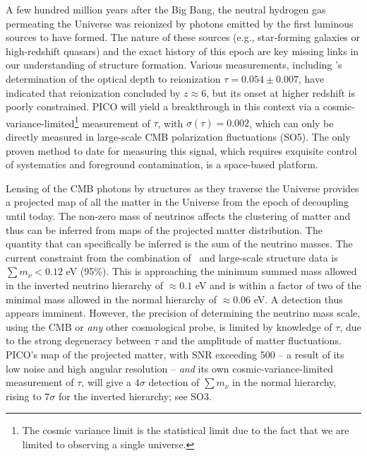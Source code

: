 \documentclass[PICOReport.tex]{subfiles}
\begin{document}
A few hundred million years after the Big Bang, the neutral hydrogen gas permeating the Universe was reionized by photons emitted by the first luminous sources to have formed.  The nature of these sources (e.g., star-forming galaxies or high-redshift quasars) and the exact history of this epoch are key missing links in our understanding of structure formation.  Various measurements, including \planck 's determination of the optical depth to reionization $\tau = 0.054 \pm 0.007$, have indicated that reionization concluded by $z \approx 6$, but its onset at higher redshift is poorly constrained. PICO will yield a breakthrough in this context via a cosmic-variance-limited\footnote{The cosmic variance limit is the statistical limit due to the fact that we are limited to observing a single universe.} measurement of $\tau$, with $\sigma(\tau)=0.002$, which can only be directly measured in large-scale CMB polarization fluctuations (SO5).  The only proven method to date for measuring this signal, which requires exquisite control of systematics and foreground contamination, is a space-based platform. 

Lensing of the CMB photons by structures as they traverse the Universe provides a projected map of all the matter in the Universe from the epoch of decoupling until today.  The non-zero mass of neutrinos affects the clustering of matter and thus can be inferred from maps of the projected matter distribution. The quantity that can specifically be inferred is the sum of the neutrino masses.  The current constraint from the combination of \planck\ and large-scale structure data is $\sum m_{\nu} < 0.12$ eV (95\%).  This is approaching the minimum summed mass allowed in the inverted neutrino hierarchy of $\approx 0.1$ eV and is within a factor of two of the minimal mass allowed in the normal hierarchy of $\approx 0.06$ eV.  A detection thus appears imminent.  However, the precision of determining the neutrino mass scale, using the CMB or {\it any} other cosmological probe, is limited by knowledge of $\tau$, due to the strong degeneracy between $\tau$ and the amplitude of matter fluctuations.  PICO's map of the projected matter, with \ac{SNR} exceeding 500 -- a result of its low noise and high angular resolution -- {\it and} its own cosmic-variance-limited measurement of $\tau$, will give a $4\sigma$ detection of $\sum m_{\nu}$ in the normal hierarchy, rising to $7\sigma$ for the inverted hierarchy; see SO3. 

\end{document}
